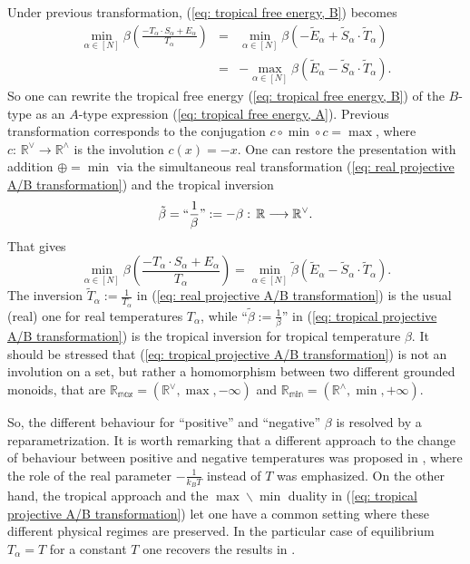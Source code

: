 \documentclass[11pt,british,reqno]{article}
\numberwithin{equation}{section}
\numberwithin{figure}{section}
\numberwithin{table}{section}
\theoremstyle{definition}
\theoremstyle{definition}
\theoremstyle{plain}
\theoremstyle{plain}
\theoremstyle{remark}
\theoremstyle{plain}
\numberwithin{equation}{section}
\numberwithin{figure}{section}
\numberwithin{table}{section}
\theoremstyle{plain}
\begin{document}
Under previous transformation, (\ref{eq: tropical free energy, B})
becomes 
\begin{eqnarray}
\min_{\alpha\in[N]}\beta\left(\frac{-T_{\alpha}\cdot S_{\alpha}+E_{\alpha}}{T_{\alpha}}\right)&=&\min_{\alpha\in[N]}\beta\left(-\tilde{E}_{\alpha}+\tilde{S}_{\alpha}\cdot\tilde{T}_{\alpha}\right)\nonumber \\
&=&-\max_{\alpha\in[N]}\beta\left(\tilde{E}_{\alpha}-\tilde{S}_{\alpha}\cdot\tilde{T}_{\alpha}\right).\label{eq: tropical free energy, A}
\end{eqnarray}
So one can rewrite the tropical free energy (\ref{eq: tropical free energy, B})
of the $B$-type as an $A$-type expression (\ref{eq: tropical free energy, A}).
Previous transformation corresponds to the conjugation $c\circ\min\circ c=\max$,
where $c:\,\mathbb{R}^{\vee}\longrightarrow\mathbb{R}^{\wedge}$ is
the involution $c(x)=-x$. One can restore the presentation with addition
$\oplus=\min$ via the simultaneous real transformation (\ref{eq: real projective A/B transformation})
and the tropical inversion 
\begin{equation}
\tilde{\beta}=``\frac{1}{\beta}":=-\beta:\,\mathbb{R}\longrightarrow\mathbb{R}^{\vee}.\label{eq: tropical projective A/B transformation}
\end{equation}
That gives 
\begin{equation}
\min_{\alpha\in[N]}\beta\left(\frac{-T_{\alpha}\cdot S_{\alpha}+E_{\alpha}}{T_{\alpha}}\right)=\min_{\alpha\in[N]}\tilde{\beta}\left(\tilde{E}_{\alpha}-\tilde{S}_{\alpha}\cdot\tilde{T}_{\alpha}\right).\label{eq: tropical free energy, A, tropical inversion}
\end{equation}
The inversion ${\displaystyle \tilde{T}_{\alpha}:=\frac{1}{T_{\alpha}}}$
in (\ref{eq: real projective A/B transformation}) is the usual (real)
one for real temperatures $T_{\alpha}$, while ``$\displaystyle \tilde{\beta}:=\frac{1}{\beta}$''
in (\ref{eq: tropical projective A/B transformation}) is the tropical
inversion for tropical temperature $\beta$. It should be
stressed that (\ref{eq: tropical projective A/B transformation})
is not an involution on a set, but rather a homomorphism between two
different grounded monoids, that are $\mathbb{R_{\max}}=(\mathbb{R}^{\vee},\max,-\infty)$
and $\mathbb{R_{\min}}=(\mathbb{R}^{\wedge},\min,+\infty)$. 

So, the different behaviour for ``positive'' and ``negative''
$\beta$ is resolved by a reparametrization. It is worth
remarking that a different approach to the change of behaviour between
positive and negative temperatures was proposed in \cite{Ramsey1956},
where the role of the real parameter ${\displaystyle -\frac{1}{k_{B}T}}$ instead of $T$
was emphasized. On the other hand, the tropical approach and the $\max\backslash\min$
duality in (\ref{eq: tropical projective A/B transformation}) let
one have a common setting where these different physical regimes
are preserved. In the particular case of equilibrium $T_{\alpha}=T$ for a constant
$T$ one recovers the results in \cite{AK2015}. 
\end{document}
